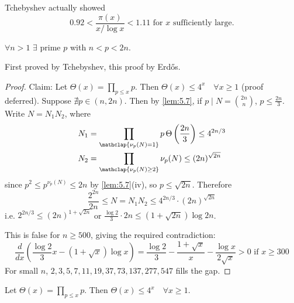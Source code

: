 \documentclass{article}
\begin{document}
Tchebyshev actually showed
\begin{equation*}
    0.92 < \frac{\pi(x)}{{x}/{\log x}} < 1.11 \text{ for $x$ sufficiently large.}
\end{equation*}

\begin{nthm}\label{thm:5.9}
    $\forall n > 1$ $\exists$ prime $p$ with $n < p < 2n$.
\end{nthm}

First proved by Tchebyshev, this proof by Erd\H{o}s.
\begin{proof}
    Claim: Let $\Theta(x) = \prod_{p \leq x} p$. Then $\Theta(x) \leq 4^x \quad \forall x \geq 1$ (proof deferred).
    Suppose $\nexists p \in (n, 2n)$. Then by \cref{lem:5.7}, if $p \mid N = \binom{2n}{n}$, $p \leq \frac{2n}{3}$.
    Write $N = N_1 N_2$, where
    \begin{align*}
        N_1 &= \prod_{\mathclap{\nu_p(N) = 1}} p\, \Theta\left(\frac{2n}{3}\right) \leq 4^{2n/3} \\
        N_2 &= \prod_{\mathclap{\nu_p(N) \geq 2}} \nu_p(N) \leq (2n)^{\sqrt{2n}}
    \end{align*}
    since  $p^2 \leq p^{\nu_p(N)} \leq 2n$  by \cref{lem:5.7}(iv), so $p \leq \sqrt{2n}$.
    Therefore
    \begin{equation*}
        \frac{2^{2n}}{2n} \leq N = N_1 N_2 \leq 4^{2n/3} \cdot (2n)^{\sqrt{2n}}
    \end{equation*}
    i.e. $2^{2n/3} \leq (2n)^{1 + \sqrt{2n}}$ or $\frac{\log 2}{3} \cdot 2n \leq (1 + \sqrt{2n}) \log 2n$.

    This is false for $n \geq 500$, giving the required contradiction:
    \begin{equation*}
        \frac{d}{dx} \left(\frac{\log 2}{3} x - (1 + \sqrt{x}) \log x\right) = \frac{\log 2}{3} - \frac{1+\sqrt{x}}{x} - \frac{\log x}{2 \sqrt{x}} > 0 \text{ if } x \geq 300
    \end{equation*}
    For small $n$, $2,3,5,7,11,19,37,73,137,277,547$ fills the gap.
\end{proof}

\begin{prop}
    Let $\Theta(x) = \prod_{p \leq x} p$. Then $\Theta(x) \leq 4^x \quad \forall x \geq 1$.
\end{prop}
\end{document}
